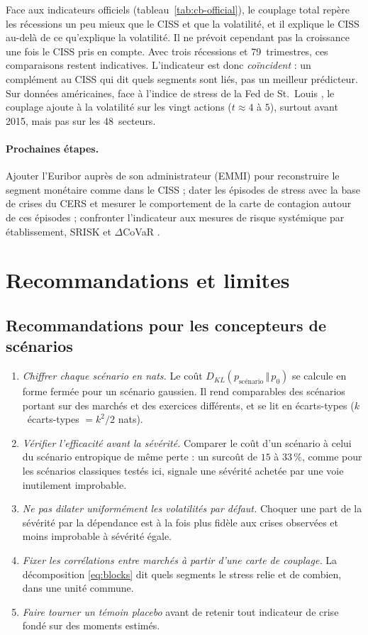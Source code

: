 \documentclass[11pt]{article}
\theoremstyle{definition}
\newcommand{\KL}[2]{D_{KL}\!\left(#1\,\Vert\,#2\right)}
\begin{document}
Face aux indicateurs officiels (tableau~\ref{tab:cb-official}), le couplage
total repère les récessions un peu mieux que le CISS et que la volatilité, et
il explique le CISS au-delà de ce qu'explique la volatilité. Il ne prévoit
cependant pas la croissance une fois le CISS pris en compte. Avec trois
récessions et 79~trimestres, ces comparaisons restent indicatives.
L'indicateur est donc \emph{coïncident} : un complément au CISS qui dit quels
segments sont liés, pas un meilleur prédicteur. Sur données américaines, face à
l'indice de stress de la Fed de St.~Louis \citep{kliesen2010}, le couplage
ajoute à la volatilité sur les vingt actions ($t\approx4$ à $5$), surtout
avant 2015, mais pas sur les 48~secteurs.

\paragraph{Prochaines étapes.} Ajouter l'Euribor auprès de son administrateur
(EMMI) pour reconstruire le segment monétaire comme dans le CISS ; dater les
épisodes de stress avec la base de crises du CERS \citep{loduca2017} et
mesurer le comportement de la carte de contagion autour de ces épisodes ;
confronter l'indicateur aux mesures de risque systémique par établissement,
SRISK \citep{brownlees2017} et $\Delta$CoVaR \citep{adrian2016}.

\section{Recommandations et limites}
\label{sec:reco}

\subsection{Recommandations pour les concepteurs de scénarios}

\begin{enumerate}
\item \emph{Chiffrer chaque scénario en nats.} Le coût
$\KL{p_{\text{scénario}}}{p_0}$ se calcule en forme fermée pour un scénario
gaussien. Il rend comparables des scénarios portant sur des marchés et des
exercices différents, et se lit en écarts-types ($k$~écarts-types $=k^2/2$
nats).
\item \emph{Vérifier l'efficacité avant la sévérité.} Comparer le coût d'un
scénario à celui du scénario entropique de même perte : un surcoût de $15$ à
$33\,\%$, comme pour les scénarios classiques testés ici, signale une sévérité
achetée par une voie inutilement improbable.
\item \emph{Ne pas dilater uniformément les volatilités par défaut.} Choquer
une part de la sévérité par la dépendance est à la fois plus fidèle aux
crises observées et moins improbable à sévérité égale.
\item \emph{Fixer les corrélations entre marchés à partir d'une carte de
couplage.} La décomposition \eqref{eq:blocks} dit quels segments le stress
relie et de combien, dans une unité commune.
\item \emph{Faire tourner un témoin placebo} avant de retenir tout indicateur
de crise fondé sur des moments estimés.
\end{enumerate}
\end{document}
